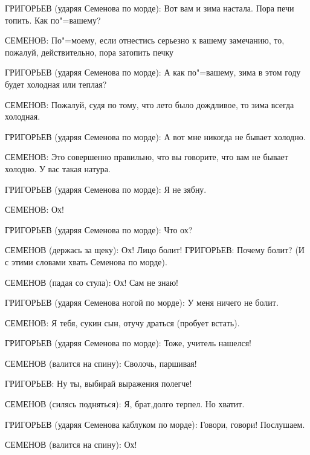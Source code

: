 ГРИГОРЬЕВ (ударяя Семенова по морде): Вот вам и зима настала. Пора печи
топить. Как по"=вашему?

СЕМЕНОВ: По"=моему, если отнестись серьезно к вашему замечанию, то, пожалуй, действительно, пора затопить печку

ГРИГОРЬЕВ (ударяя Семенова по морде): А как по"=вашему, зима в этом году
будет холодная или теплая?

СЕМЕНОВ: Пожалуй, судя по тому, что лето было дождливое, то зима всегда
холодная.

ГРИГОРЬЕВ (ударяя Семенова по морде): А вот мне никогда не бывает холодно.

СЕМЕНОВ: Это совершенно правильно, что вы говорите, что вам не бывает
холодно. У вас такая натура.

ГРИГОРЬЕВ (ударяя Семенова по морде): Я не зябну.

СЕМЕНОВ: Ох!

ГРИГОРЬЕВ (ударяя Семенова по морде): Что ох?

СЕМЕНОВ (держась за щеку): Ох! Лицо болит! ГРИГОРЬЕВ: Почему болит?
(И с этими словами хвать Семенова по морде).

СЕМЕНОВ (падая со стула): Ох! Сам не знаю!

ГРИГОРЬЕВ (ударяя Семенова ногой по морде): У меня ничего не болит.

СЕМЕНОВ: Я тебя, сукин сын, отучу драться (пробует встать).

ГРИГОРЬЕВ (ударяя Семенова по морде): Тоже, учитель нашелся!

СЕМЕНОВ (валится на спину): Сволочь, паршивая!

ГРИГОРЬЕВ: Ну ты, выбирай выражения полегче!

СЕМЕНОВ (силясь подняться): Я, брат,долго терпел. Но хватит.

ГРИГОРЬЕВ (ударяя Семенова каблуком по морде): Говори, говори! Послушаем.

СЕМЕНОВ (валится на спину): Ох!
